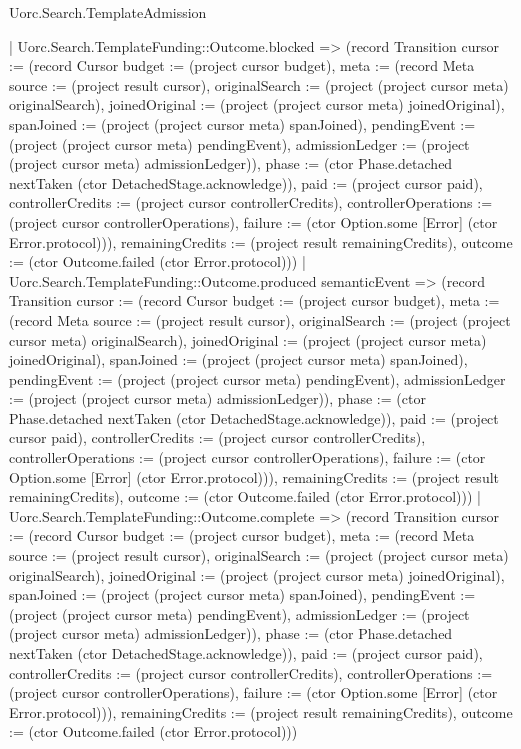 \begin{lexlean}{Uorc.Search.TemplateAdmission}
\begin{semanticmodule}
{    | Uorc.Search.TemplateFunding::Outcome.blocked => (record Transition {cursor := (record Cursor {budget := (project cursor budget), meta := (record Meta {source := (project result cursor), originalSearch := (project (project cursor meta) originalSearch), joinedOriginal := (project (project cursor meta) joinedOriginal), spanJoined := (project (project cursor meta) spanJoined), pendingEvent := (project (project cursor meta) pendingEvent), admissionLedger := (project (project cursor meta) admissionLedger)}), phase := (ctor Phase.detached nextTaken (ctor DetachedStage.acknowledge)), paid := (project cursor paid), controllerCredits := (project cursor controllerCredits), controllerOperations := (project cursor controllerOperations), failure := (ctor Option.some [Error] (ctor Error.protocol))}), remainingCredits := (project result remainingCredits), outcome := (ctor Outcome.failed (ctor Error.protocol))})
    | Uorc.Search.TemplateFunding::Outcome.produced semanticEvent => (record Transition {cursor := (record Cursor {budget := (project cursor budget), meta := (record Meta {source := (project result cursor), originalSearch := (project (project cursor meta) originalSearch), joinedOriginal := (project (project cursor meta) joinedOriginal), spanJoined := (project (project cursor meta) spanJoined), pendingEvent := (project (project cursor meta) pendingEvent), admissionLedger := (project (project cursor meta) admissionLedger)}), phase := (ctor Phase.detached nextTaken (ctor DetachedStage.acknowledge)), paid := (project cursor paid), controllerCredits := (project cursor controllerCredits), controllerOperations := (project cursor controllerOperations), failure := (ctor Option.some [Error] (ctor Error.protocol))}), remainingCredits := (project result remainingCredits), outcome := (ctor Outcome.failed (ctor Error.protocol))})
    | Uorc.Search.TemplateFunding::Outcome.complete => (record Transition {cursor := (record Cursor {budget := (project cursor budget), meta := (record Meta {source := (project result cursor), originalSearch := (project (project cursor meta) originalSearch), joinedOriginal := (project (project cursor meta) joinedOriginal), spanJoined := (project (project cursor meta) spanJoined), pendingEvent := (project (project cursor meta) pendingEvent), admissionLedger := (project (project cursor meta) admissionLedger)}), phase := (ctor Phase.detached nextTaken (ctor DetachedStage.acknowledge)), paid := (project cursor paid), controllerCredits := (project cursor controllerCredits), controllerOperations := (project cursor controllerOperations), failure := (ctor Option.some [Error] (ctor Error.protocol))}), remainingCredits := (project result remainingCredits), outcome := (ctor Outcome.failed (ctor Error.protocol))})
}
\end{semanticmodule}
\end{lexlean}
